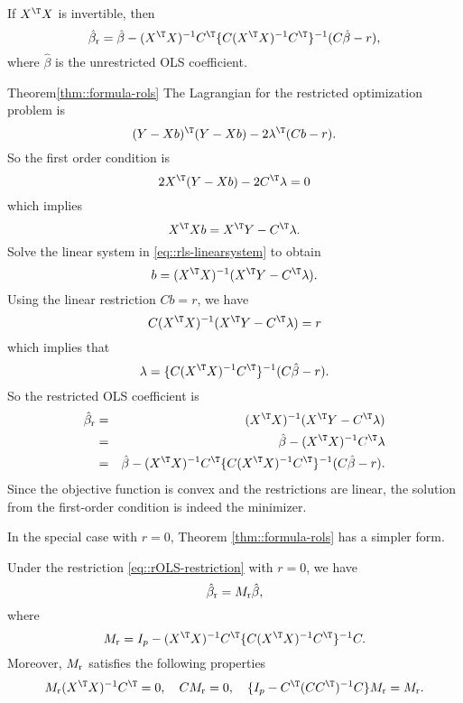\begin{theorem}
\label{thm::formula-rols}
If $ X^{\T} X$ is invertible, then
$$
\hat{\beta}_\textup{r} = \hat{\beta} - (X^{\T} X)^{-1} C ^{\T} \{  C  (X^{\T} X)^{-1} C ^{\T} \}^{-1} (C  \hat{\beta} - r), 
$$
where $\hat{\beta}  $ is the unrestricted OLS coefficient. 
\end{theorem}


\begin{myproof}{Theorem}{\ref{thm::formula-rols}}
The Lagrangian for the restricted optimization problem is
$$
(Y - Xb)^{\T} (Y - Xb) - 2\lambda^{\T} (C b - r).
$$
So the first order condition is
$$
2X^{\T} (Y - Xb) - 2 C^{\T} \lambda = 0 
$$
which implies
\begin{equation}\label{eq::rls-linearsystem}
X^{\T}  X b = X^{\T} Y  -  C^{\T} \lambda .
\end{equation}
Solve the linear system in \eqref{eq::rls-linearsystem} to obtain
$$
b = (X^{\T}  X)^{-1}  (X^{\T} Y  -  C^{\T} \lambda).
$$
Using the linear restriction $C b = r$, we have
$$
C (X^{\T}  X)^{-1}  (X^{\T} Y  -  C^{\T} \lambda) = r
$$
which implies that
$$
\lambda =  
\{  C(X^{\T} X)^{-1} C^{\T} \}^{-1} (C  \hat{\beta} - r ).
$$
So the restricted OLS coefficient is
\begin{eqnarray*}
\hat{\beta}_\textup{r} 
&=& (X^{\T}  X)^{-1}  (X^{\T} Y  -  C^{\T} \lambda)  \\
&=&   \hat{\beta}  -  (X^{\T}  X)^{-1} C^{\T} \lambda  \\
&=&\hat{\beta} - (X^{\T} X)^{-1} C ^{\T} \{  C  (X^{\T} X)^{-1} C ^{\T} \}^{-1} (C  \hat{\beta} - r).
\end{eqnarray*}
Since the objective function is convex and the restrictions are linear, the solution from the first-order condition is indeed the minimizer. 
\end{myproof}
 
 
 
In the special case with $r=0$, Theorem \ref{thm::formula-rols} has a simpler form.

 \begin{corollary}
 \label{corollary::formula-rols-homo}
 Under the restriction \eqref{eq::rOLS-restriction} with $r=0$, we have 
 $$
\hat{\beta}_\textup{r}  =  M_\textup{r}  \hat{\beta} ,
 $$
 where 
  $$
 M_\textup{r} = I_p - (X^{\T} X)^{-1}  C ^{\T} \{  C  (X^{\T} X)^{-1} C ^{\T} \}^{-1}  C .
 $$ 
 Moreover, $ M_\textup{r} $ satisfies the following properties
 $$
 M_\textup{r}  (X^{\T} X)^{-1}  C ^{\T} = 0,
 \quad
 C  M_\textup{r}  = 0,
 \quad 
 \{ I_p -  C^{\T} (C C^{\T})^{-1} C \}  M_\textup{r} =  M_\textup{r} .
 $$
 \end{corollary}

